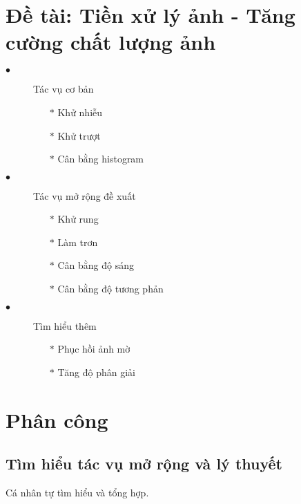 \documentclass[margin = 1in]{extarticle}
\begin{document}
	
	\pagebreak
	
	\section[\Large]{Đề tài: Tiền xử lý ảnh - Tăng cường chất lượng ảnh}
	
	\begin{description}
		\item[$\bullet$] Tác vụ cơ bản
		\begin{itemize}
			
			\item[$\ast$] Khử nhiễu
			
			\item[$\ast$] Khử trượt
			\item[$\ast$] Cân bằng histogram
	
		\end{itemize}
		\item[$\bullet$] Tác vụ mở rộng đề xuất
		\begin{itemize}
			\item[$\ast$] Khử rung
			\item[$\ast$] Làm trơn
			\item[$\ast$] Cân bằng độ sáng
			\item[$\ast$] Cân bằng độ tương phản
			
		\end{itemize}
		\item[$\bullet$] Tìm hiểu thêm
		\begin{itemize}
			\item[$\ast$] Phục hồi ảnh mờ
			\item[$\ast$] Tăng độ phân giải
		\end{itemize}
	\end{description}


	\section[\Large]{Phân công}
	
	\subsection{Tìm hiểu tác vụ mở rộng và lý thuyết}
		Cá nhân tự tìm hiểu và tổng hợp.
\end{document}
